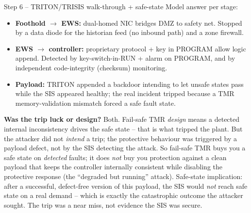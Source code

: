 \documentclass[11pt,a4paper]{article}
\begin{document}
\begin{solutionbox}{Step 6 -- TRITON/TRISIS walk-through + safe-state}
Model answer per stage:
\begin{itemize}[leftmargin=*, nosep]
  \item \textbf{Foothold $\to$ EWS:} dual-homed NIC bridges DMZ to safety net.
        Stopped by a data diode for the historian feed (no inbound path) and
        a zone firewall.
  \item \textbf{EWS $\to$ controller:} proprietary protocol + key in PROGRAM
        allow logic append. Detected by key-switch-in-RUN + alarm on PROGRAM,
        and by independent code-integrity (checksum) monitoring.
  \item \textbf{Payload:} TRITON appended a backdoor intending to let unsafe
        states pass while the SIS appeared healthy; the real incident tripped
        because a TMR memory-validation mismatch forced a safe fault state.
\end{itemize}
\textbf{Was the trip luck or design?} Both. Fail-safe TMR \emph{design} means a
detected internal inconsistency drives the safe state -- that is what tripped
the plant. But the attacker did not \emph{intend} a trip; the protective
behaviour was triggered by a payload defect, not by the SIS detecting the
attack. So fail-safe TMR buys you a safe state on \emph{detected} faults; it
does \emph{not} buy you protection against a clean payload that keeps the
controller internally consistent while disabling the protective response (the
``degraded but running'' attack). Safe-state implication: after a successful,
defect-free version of this payload, the SIS would \emph{not} reach safe state
on a real demand -- which is exactly the catastrophic outcome the attacker
sought. The trip was a near miss, not evidence the SIS was secure.
\end{solutionbox}
\end{document}
